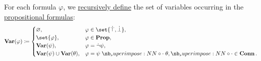 \begin{definition}\label{def:propositional_formula_variables}\mimprovised
  For each formula \( \varphi \), we \hyperref[con:evaluation]{recursively define} the set of variables occurring in the \hyperref[def:propositional_syntax/formula]{propositional formulas}:
  \begin{equation*}
    \op*{Var}(\varphi) \coloneqq \begin{cases}
      \varnothing,                            &\varphi \in \set{ \syntop, \synbot }, \\
      \set{ \varphi },                        &\varphi \in \op*{Prop}, \\
      \op*{Var}(\psi),                        &\varphi = \synneg \psi, \\
      \op*{Var}(\psi) \cup \op*{Var}(\theta), &\varphi = \psi \syncirc \theta, {\syncirc} \in \op*{Conn}.
    \end{cases}
  \end{equation*}
\end{definition}


